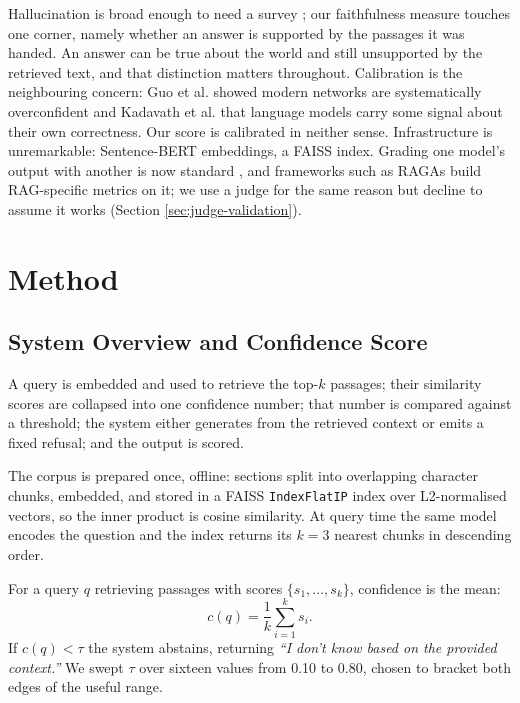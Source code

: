 \documentclass[conference]{IEEEtran}
\begin{document}
Hallucination is broad enough to need a survey \cite{ji2023survey}; our faithfulness measure touches one corner, namely whether an answer is supported by the passages it was handed. An answer can be true about the world and still unsupported by the retrieved text, and that distinction matters throughout. Calibration is the neighbouring concern: Guo et al. \cite{guo2017calibration} showed modern networks are systematically overconfident and Kadavath et al. \cite{kadavath2022know} that language models carry some signal about their own correctness. Our score is calibrated in neither sense. Infrastructure is unremarkable: Sentence-BERT \cite{reimers2019sentencebert} embeddings, a FAISS \cite{johnson2019faiss} index. Grading one model's output with another is now standard \cite{zheng2023judging}, and frameworks such as RAGAs \cite{es2024ragas} build RAG-specific metrics on it; we use a judge for the same reason but decline to assume it works (Section \ref{sec:judge-validation}).

\section{Method}

\subsection{System Overview and Confidence Score}

A query is embedded and used to retrieve the top-$k$ passages; their similarity scores are collapsed into one confidence number; that number is compared against a threshold; the system either generates from the retrieved context or emits a fixed refusal; and the output is scored.

The corpus is prepared once, offline: sections split into overlapping character chunks, embedded, and stored in a FAISS \texttt{IndexFlatIP} index over L2-normalised vectors, so the inner product is cosine similarity. At query time the same model encodes the question and the index returns its $k = 3$ nearest chunks in descending order.

For a query $q$ retrieving passages with scores $\{s_1, \ldots, s_k\}$, confidence is the mean:
\begin{equation}
c(q) = \frac{1}{k}\sum_{i=1}^{k} s_i .
\end{equation}
If $c(q) < \tau$ the system abstains, returning \emph{``I don't know based on the provided context.''} We swept $\tau$ over sixteen values from 0.10 to 0.80, chosen to bracket both edges of the useful range.
\end{document}
